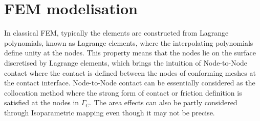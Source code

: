 \chapter{FEM modelisation}

In classical FEM, typically the elements are constructed from Lagrange polynomials, known as Lagrange elements, where the interpolating polynomials define unity at the nodes. This property means that the nodes lie on the surface discretised by Lagrange elements, which brings the intuition of Node-to-Node contact where the contact is defined between the nodes of conforming meshes at the contact interface. 
Node-to-Node contact can be essentially considered as the collocation method where the strong form of contact or friction definition is satisfied at the nodes in $\Gamma_C$. The area effects can also be partly considered through Isoparametric mapping even though it may not be precise.\\


